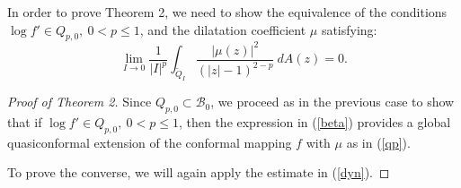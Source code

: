 \documentclass[12pt,a4paper]{article}
\theoremstyle{definition}
\theoremstyle{remark}
\numberwithin{komcounter}{section}
\begin{document}
	
	
	
	
	


In order to  prove Theorem 2, we need to show the equivalence of the conditions $\log f'\in Q_{p,0},~0<p\leq 1$, and the dilatation coefficient $\mu$ satisfying:
\begin{equation}\label{qp}
\lim_{I\to 0} \frac{1}{|I|^p}	\int_{\tilde{Q}_I} \frac{|\mu(z)|^2}{(|z|-1)^{2-p} }~ dA(z)=0.
\end{equation}



\begin{proof}[Proof of Theorem 2]
	
Since $Q_{p,0}\subset \mathcal{B}_0$, we proceed as in the previous case to show that if $\log f'\in  Q_{p,0},~0<p\leq 1$, then the expression in (\ref{beta}) provides  a global quasiconformal extension of the conformal mapping $f$ with $\mu$ as in (\ref{qp}).

To prove the converse, we will again apply  the estimate in (\ref{dyn}).



\end{proof}
\end{document}
